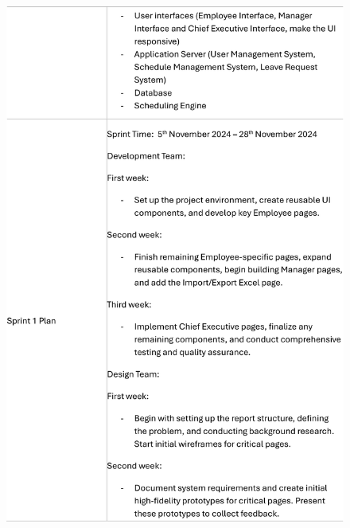 \documentclass[a4paper,12pt, oneside]{report}
\begin{document}
\begin{appendices}
\begin{figure}[H]
    \includegraphics[width=\textwidth]{Minutes/Minutes_4-cropped-2.png}
\end{figure}
\newpage
\begin{figure}[H]
    \centering

\end{figure}
\end{appendices}
\end{document}
